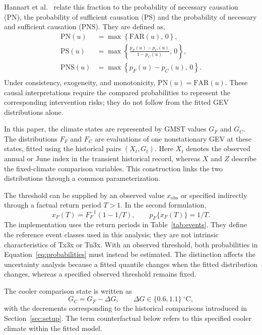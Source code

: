 \documentclass[11pt]{article}
\begin{document}
Hannart et al.\ \cite{hannart2016causal} relate this fraction to the
probability of necessary causation (PN), the probability of sufficient 
causation (PS) and the probability of necessary and sufficient causation
(PNS). They are defined as,
\begin{equation}
    \begin{aligned}
    \mathrm{PN}(u)
        &= \max\!\left\{\mathrm{FAR}(u),\,0\right\}, \\[6pt]
    \mathrm{PS}(u)
        &= \max\!\left\{
       \frac{p_F(u)-p_C(u)}{1-p_C(u)},\,0
     \right\}, \\[6pt]
    \mathrm{PNS}(u)
        &= \max\!\left\{p_F(u)-p_C(u),\,0\right\}. \\[6pt]
\end{aligned}
\label{eq:causalrisks}
\end{equation}
Under consistency, exogeneity, and monotonicity,
 $\mathrm{PN}(u)=\mathrm{FAR}(u)$.
These causal interpretations require the
compared probabilities to represent the corresponding intervention
risks; they do not follow from the fitted GEV distributions alone.

In this paper, the climate states are represented by GMST values $G_F$ and $G_C$. The
distributions $F_F$ and $F_C$ are evaluations of one nonstationary GEV
at these states, fitted using the historical pairs $(X_t,G_t)$. Here
$X_t$ denotes the observed annual or June index in the transient
historical record, whereas $X$ and $Z$ describe the fixed-climate
comparison variables. This construction links the two distributions
through a common parameterization.

The threshold can be supplied by an observed value $x_{\mathrm{obs}}$ or
specified indirectly through a factual return period $T>1$. In the
second formulation,
\begin{equation}
x_F(T)=F_F^{-1}(1-1/T),\qquad p_F\{x_F(T)\}=1/T.
\label{eq:threshold}
\end{equation}
The implementation uses the return periods in Table~\ref{tab:events}.
They define the reference event classes used in this analysis; they are
not intrinsic characteristics of Tx3x or Tn3x. With an observed
threshold, both probabilities in Equation~\eqref{eq:probabilities} must
instead be estimated. The distinction affects the uncertainty analysis
because a fitted quantile changes when the fitted distribution changes,
whereas a specified observed threshold remains fixed.

The cooler comparison state is written as
\begin{equation}
G_C=G_F-\Delta G,\qquad
\Delta G\in\{0.6,1.1\}\ ^{\circ}\mathrm{C},
\label{eq:climate}
\end{equation}
with the decrements corresponding to the historical comparisons
introduced in Section~\ref{sec:setup}. The term counterfactual below
refers to this specified cooler climate within the fitted model.
\end{document}

